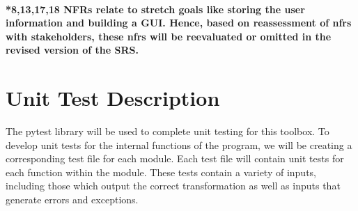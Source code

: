 \documentclass[12pt, titlepage]{article}
\begin{document}
\paragraph{*8,13,17,18 NFRs relate to stretch goals like storing the user information and building a GUI. Hence, based on reassessment of nfrs with stakeholders, these nfrs will be reevaluated or omitted in the revised version of the SRS.}
\begin{table}[H]
\centering
{}
\caption{Traceability Matrix Showing the Connections Between Non Functional Requirements and their test.}
\label{Table:trace}
\end{table}


\section{Unit Test Description}

The pytest library will be used to complete unit testing for this toolbox. To develop unit tests for the internal functions of the program, we will be creating a corresponding test file for each module. Each test file will contain unit tests for each function within the module. These tests contain a variety of inputs, including those which output the correct transformation as well as inputs that generate errors and exceptions. \\
\end{document}
